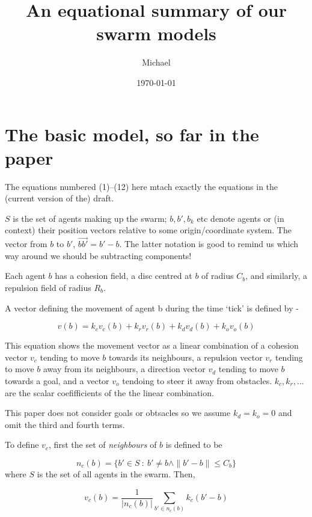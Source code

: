 \documentclass[12pt,a4paper]{article}
\title{An equational summary of our swarm models}
\author{Michael}
\date{\today}
\begin{document}
\maketitle


\section{The basic model, so far in the paper}
The equations numbered (1)--(12) here mtach exactly the equations in the (current version of the) draft.

$S$ is the set of agents making up the swarm; $b, b', b_k$ etc denote agents or (in context) their position vectors relative to some origin/coordinate system. The vector from $b$ to $b'$, $\vec{bb'} = b' - b$. The latter notation is good to remind us which way around we should be subtracting components!

Each agent $b$ has a cohesion field, a disc centred at $b$ of radius $C_b$, and similarly, a repulsion field of radius $R_b$.

A vector defining the movement of agent b during the time `tick' is defined by -

\begin{equation}\label{eq:rsltntVctr}
	v(b) = k_c v_c(b) + k_r v_r(b) + k_d v_d(b) + k_o v_o(b)
\end{equation}

This equation shows the movement vector as a linear combination of a cohesion vector $v_c$ tending to move $b$ towards its neighbours, a repulsion vector $v_r$ tending to move $b$ away from its neighbours, a direction vector  $v_d$ tending to move $b$ towards a goal, and a vector $v_o$ tendoing to steer it away from obstacles. $k_c, k_r, ...$ are the scalar coefifficients of the the linear combination.

This paper does not consider goals or obtsacles so we  assume $k_d = k_o = 0$ and omit the third and fourth terms.

To define $v_c$, first the set of \emph{neighbours} of $b$ is defined to be

\begin{equation}\label{eq:coh1}
n_c(b) = \{b' \in S~:~b' \neq b \wedge \|b' - b\| \leq C_b\}
\end{equation}
where $S$ is the set of all agents in the swarm. Then,

\begin{equation}\label{eq:coh2}
v_c(b) = \frac{1}{|n_c(b)|} \sum_{b' \in n_c(b)}k_c (b' - b)
\end{equation}
\end{document}
